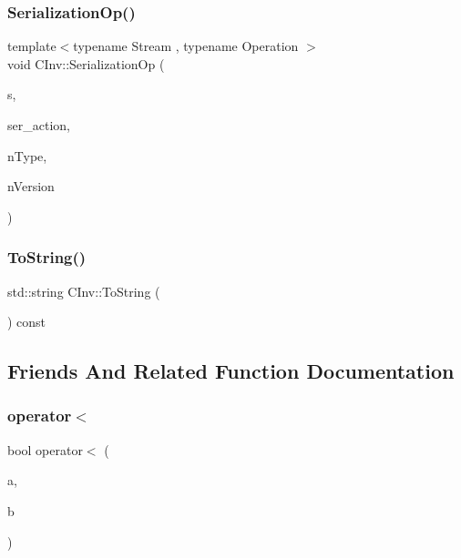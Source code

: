 \subsubsection{\texorpdfstring{Serialization\+Op()}{SerializationOp()}}
{\footnotesize\ttfamily template$<$typename Stream , typename Operation $>$ \\
void C\+Inv\+::\+Serialization\+Op (\begin{DoxyParamCaption}\item[{Stream \&}]{s,  }\item[{Operation}]{ser\+\_\+action,  }\item[{int}]{n\+Type,  }\item[{int}]{n\+Version }\end{DoxyParamCaption})\hspace{0.3cm}{\ttfamily [inline]}}

\mbox{\label{class_c_inv_a5bf13e9595035d2155b04cceb848c37d}} 
\subsubsection{\texorpdfstring{To\+String()}{ToString()}}
{\footnotesize\ttfamily std\+::string C\+Inv\+::\+To\+String (\begin{DoxyParamCaption}{ }\end{DoxyParamCaption}) const}



\subsection{Friends And Related Function Documentation}
\mbox{\label{class_c_inv_a2684809000d3a0523769ad7585ace197}} 
\subsubsection{\texorpdfstring{operator$<$}{operator<}}
{\footnotesize\ttfamily bool operator$<$ (\begin{DoxyParamCaption}\item[{const \mbox{\hyperlink{class_c_inv}{C\+Inv}} \&}]{a,  }\item[{const \mbox{\hyperlink{class_c_inv}{C\+Inv}} \&}]{b }\end{DoxyParamCaption})\hspace{0.3cm}{\ttfamily [friend]}}



